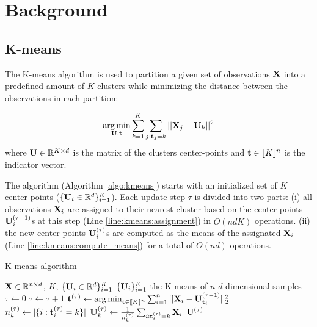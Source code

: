 \section{Background}
\label{sec:background}
\subsection{K-means}
\label{sec:kmeans}
The K-means algorithm is used to partition a given set of observations ${\mathbf{X}}$ into a predefined amount of $K$ clusters while minimizing the distance between the observations in each partition:

\begin{equation}
\label{eq:kmean_problem}
    \operatorname*{arg\,min}_{{\mathbf{U}}, {\mathbf{t}}} \sum_{k=1}^{K} \sum_{j: {\mathbf{t}}_j = k} ||{\mathbf{X}}_j -{\mathbf{U}}_k||^2 \\
\end{equation}
where ${\mathbf{U}} \in \mathbb{R}^{K \times d}$ is the matrix of the clusters center-points and ${\mathbf{t}} \in  [\![K]\!]^n$ is the indicator vector.

The algorithm (Algorithm \ref{algo:kmeans}) starts with an initialized set of $K$ center-points ($\{{\mathbf{U}}_i \in \mathbb{R}^d\}_{i=1}^{K}$). Each update step $\tau$ is divided into two parts: (i) all observations ${\mathbf{X}}_i$ are assigned to their nearest cluster based on the center-points ${\mathbf{U}}_i^{(\tau-1)}$s at this step (Line \ref{line:kmeans:assignment}) in $O(ndK)$ operations. (ii) the new center-points ${\mathbf{U}}_i^{(\tau)}$s are computed as the means of the assignated ${\mathbf{X}}_i$ (Line \ref{line:kmeans:compute_means}) for a total of $O(nd)$ operations.

\begin{algorithm}
\caption{K-means algorithm}
\label{algo:kmeans}
\begin{algorithmic}[1]


\REQUIRE ${\mathbf{X}} \in \mathbb{R}^{n \times d}$, $K$, $\{{\mathbf{U}}_i \in \mathbb{R}^d\}_{i=1}^{K}$
\ENSURE $\{{\mathbf{U}}_i\}_{i=1}^{K}$ the K means of $n$ $d$-dimensional samples
\STATE $\tau \leftarrow 0$
\REPEAT
\STATE $\tau \leftarrow \tau + 1$
\STATE ${\mathbf{t}}^{(\tau)} \leftarrow \operatorname*{arg\,min}_{{\mathbf{t}} \in [\![K]\!]^n} \sum_{i=1}^{n} {||{\mathbf{X}}_i - {\mathbf{U}}^{(\tau-1)}_{{\mathbf{t}}_i}||_2^2}$
\label{line:kmeans:assignment}
\STATE $n_k^{(\tau)} \leftarrow |\{i: {\mathbf{t}}^{(\tau)}_i=k\}|$
\label{line:kmeans:count}
\STATE ${\mathbf{U}}^{(\tau)}_k \leftarrow \frac{1}{n_k^{(\tau)}} \sum_{i: {\mathbf{t}}^{(\tau)}_i = k} {{\mathbf{X}}_i}$
\label{line:kmeans:compute_means}
\ENDFOR
{}
\RETURN ${\mathbf{U}}^{(\tau)}$
\end{algorithmic}
\end{algorithm}


